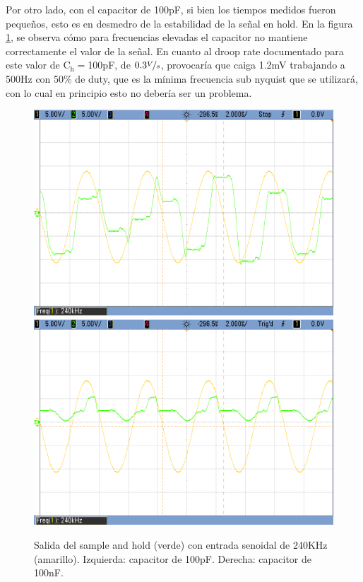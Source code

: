 \documentclass{article}
\begin{document}
Por otro lado, con el capacitor de 100pF, si bien los tiempos medidos fueron peque\~nos, esto es en desmedro de la estabilidad de la se\~nal en hold. En la figura \ref{fig:240k}, se observa c\'omo para frecuencias elevadas el capacitor no mantiene correctamente el valor de la se\~nal. En cuanto al droop rate documentado para este valor de $\mathrm{C}_\mathrm{h}=$100pF, de $0.3\nicefrac{V}{s}$, provocar\'ia que caiga 1.2mV trabajando a 500Hz con 50\% de duty, que es la m\'inima frecuencia sub nyquist que se utilizar\'a, con lo cual en principio esto no deber\'ia ser un problema. 

\begin{figure}[htb]     
	\centering     
	\includegraphics[scale=0.25]{sh/240k_100p.png}     
	\includegraphics[scale=0.25]{sh/240k_100n.png}     
	\caption{Salida del sample and hold (verde) con entrada senoidal de 240KHz (amarillo). Izquierda: capacitor de 100pF. Derecha: capacitor de 100nF.}     
	\label{fig:240k} 
\end{figure}
\end{document}
